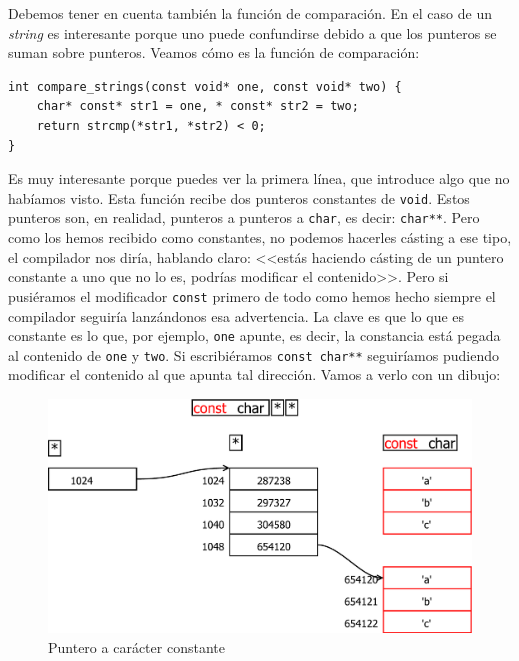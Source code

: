 \documentclass[a4paper]{article}
\begin{document}
Debemos tener en cuenta también la función de comparación. En el caso de un
\textit{string} es interesante porque uno puede confundirse debido a que los
punteros se suman sobre punteros. Veamos cómo es la función de comparación:

\noindent
\begin{minipage}[H]{\linewidth}
\mbox{}
\begin{lstlisting}[style=C,
caption={Función auxiliar de comparación de \textit{strings}},
label={lst:strcompare}]
int compare_strings(const void* one, const void* two) {
    char* const* str1 = one, * const* str2 = two;
    return strcmp(*str1, *str2) < 0;
}
\end{lstlisting}
\end{minipage}

Es muy interesante porque puedes ver la primera línea, que introduce algo
que no habíamos visto. Esta función recibe dos punteros constantes de
\verb!void!. Estos punteros son, en realidad, punteros a punteros a \verb!char!,
es decir: \verb!char**!. Pero como los hemos recibido como constantes, no
podemos hacerles cásting a ese tipo, el compilador nos diría, hablando claro:
<<estás haciendo cásting de un puntero constante a uno que no lo es, podrías
modificar el contenido>>. Pero si pusiéramos el modificador \verb!const!
primero de todo como hemos hecho siempre el compilador seguiría lanzándonos
esa advertencia. La clave es que lo que es constante es lo que, por ejemplo,
\verb!one! apunte, es decir, la constancia está pegada al contenido de
\verb!one! y \verb!two!. Si escribiéramos \verb!const char**! seguiríamos
pudiendo modificar el contenido al que apunta tal dirección. Vamos a verlo
con un dibujo:

\begin{figure}[H]
    \includegraphics[width=\linewidth]{const_char_pointer_pointer}
    \caption{Puntero a carácter constante}
    \label{img:constcharpointerpointer}
\end{figure}
\end{document}
